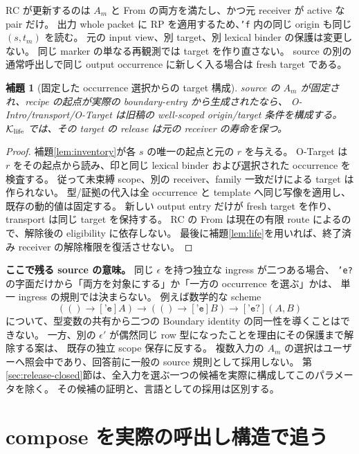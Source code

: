 \documentclass[11pt,a4paper]{article}
\newtheorem{lemma}[definition]{補題}
\newcommand{\Core}{\mathcal K}
\begin{document}
RC が更新するのは \(A_m\) と From の両方を満たし、かつ元 receiver が active な pair だけ。
出力 whole packet に RP を適用するため、\texttt{'f} 内の同じ origin も同じ \((s,t_m)\) を読む。
元の input view、別 target、別 lexical binder の保護は変更しない。
同じ marker の単なる再観測では target を作り直さない。
source の別の通常呼出しで同じ output occurrence に新しく入る場合は fresh target である。

\begin{lemma}[固定した occurrence 選択からの target 構成]
\label{lem:target}
source の \(A_m\) が固定され、recipe の起点が実際の boundary-entry から生成されたなら、
O-Intro/transport/O-Target は旧稿の well-scoped origin/target 条件を構成する。
\(\Core_{\rm life}\) では、その target の release は元の receiver の寿命を保つ。
\end{lemma}
\begin{proof}
補題\ref{lem:inventory}が各 \(s\) の唯一の起点と元の \(r\) を与える。
O-Target は \(r\) をその起点から読み、印と同じ lexical binder および選択された occurrence を検査する。
従って未束縛 scope、別の receiver、family 一致だけによる target は作られない。
型/証拠の代入は全 occurrence と template へ同じ写像を適用し、既存の動的値は固定する。
新しい output entry だけが fresh target を作り、transport は同じ target を保持する。
RC の From は現在の有限 route によるので、解除後の eligibility に依存しない。
最後に補題\ref{lem:life}を用いれば、終了済み receiver の解除権限を復活させない。
\end{proof}

\textbf{ここで残る source の意味。}
同じ \(\epsilon\) を持つ独立な ingress が二つある場合、
\texttt{'e?} の字面だけから「両方を対象にする」か「一方の occurrence を選ぶ」かは、
単一 ingress の規則では決まらない。
例えば数学的な scheme
\[
 (()\to[\texttt{'e}]A)\to(()\to[\texttt{'e}]B)
       \to[\texttt{'e?}](A,B)
\]
について、型変数の共有から二つの Boundary identity の同一性を導くことはできない。
一方、別の \(\epsilon'\) が偶然同じ row 型になったことを理由にその保護まで解除する案は、
既存の独立 scope 保存に反する。
複数入力の \(A_m\) の選択はユーザーへ照会中であり、回答前に一般の source 規則として採用しない。
第\ref{sec:release-closed}節は、全入力を選ぶ一つの候補を実際に構成してこのパラメータを除く。
その候補の証明と、言語としての採用は区別する。

\section{compose を実際の呼出し構造で追う}
\label{sec:compose}
\end{document}
